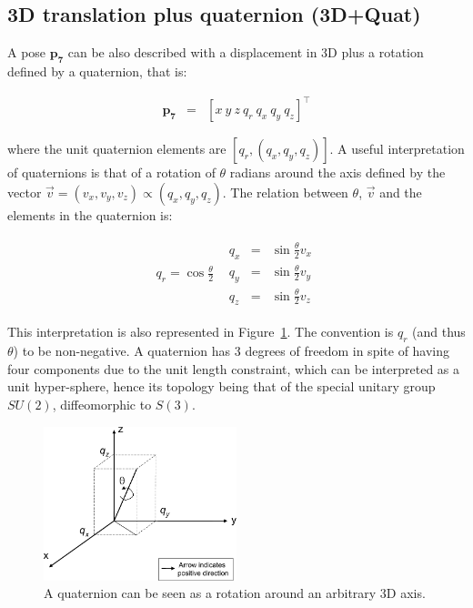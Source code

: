 \documentclass[a4paper,11pt]{report}
\begin{document}

\subsection{3D translation plus quaternion (3D+Quat)}

A pose $\mathbf{p_7}$ can be also described with a displacement in 3D plus a rotation
defined by a quaternion, that is:

\begin{eqnarray}
\mathbf{p_7} &=& [x ~ y ~ z ~  q_r ~ q_x ~ q_y ~ q_z ] ^ \top
\end{eqnarray}

\noindent where the unit quaternion elements are $[q_r, (q_x,q_y,q_z)]$. A useful interpretation of quaternions
is that of a rotation of $\theta$ radians around the axis defined by the vector $\vec{v} = (v_x,v_y,v_z) \propto (q_x,q_y,q_z)$.
The relation between $\theta$, $\vec{v}$ and the elements in the quaternion is:

\begin{equation*}
\begin{array}{cc}
q_r = \cos\frac{\theta}{2}  &
  \begin{array}{rcl}
    q_x &=& \sin\frac{\theta}{2} v_x  \\
    q_y &=& \sin\frac{\theta}{2} v_y  \\
    q_z &=& \sin\frac{\theta}{2} v_z
  \end{array}
\end{array}
\end{equation*}

This interpretation is also represented in Figure~\ref{fig:quat}.
The convention is $q_r$ (and thus $\theta$) to be non-negative.
A quaternion has 3 degrees of freedom in spite of having four components
due to the unit length constraint, which can be interpreted as a unit hyper-sphere, 
hence its topology being that of the special unitary group $SU(2)$, diffeomorphic to $S(3)$.


\begin{figure}[h]
\centering
\includegraphics[width=0.50\textwidth]{imgs/quaternion.pdf}
\caption{A quaternion can be seen as a rotation around an arbitrary 3D axis.}
\label{fig:quat}
\end{figure}
\end{document}

